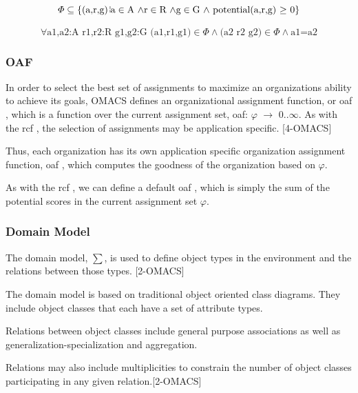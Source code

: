 \begin{equation}
\varPhi\subseteq\left\{ \left(\textrm{a,r,g}\right)\brokenvert\textrm{a}\in\textrm{A \ensuremath{\land}}\textrm{r}\in\textrm{R \ensuremath{\land\textrm{g}\in\textrm{G \ensuremath{\land} \textrm{potential(a,r,g) \ensuremath{\ge} 0}}}}\right\} 
\label{eq:TuplePhi1}
\end{equation}

\begin{equation}
\forall\textrm{a1,a2:A r1,r2:R g1,g2:G (a1,r1,g1)}\in\varPhi\land\textrm{(a2 r2 g2)}\in\varPhi\land\textrm{a1=a2}\label{eq:TuplePhi2}
\end{equation}

 		
 

\subsubsection{ OAF }
	In order to select the best set of assignments to maximize an organizations ability to achieve its goals, OMACS defines an organizational assignment function, or oaf , which is a function over the current assignment set, oaf: $\varphi$ $\rightarrow$ 0..$\infty$. As with the rcf , the selection of assignments may be application specific. [4-OMACS]
	
Thus, each organization has its own application specific organization assignment function, oaf , which computes the goodness of the organization based on $\varphi$. 
	
As with the rcf , we can define a default  oaf , which is simply the sum of the potential scores in the current assignment set $\varphi$.
                     
 
\subsubsection{ Domain Model } 

The domain model, $\sum$, is used to define object types in the environment 
and the relations between those types. [2-OMACS]

The domain model is based on traditional object oriented class diagrams. They
include object classes that each have a set of attribute types. 

Relations between object classes include general purpose associations
 as well as generalization-specialization and aggregation.
 
Relations may also include multiplicities to constrain the number of object classes participating in
any given relation.[2-OMACS]
 





